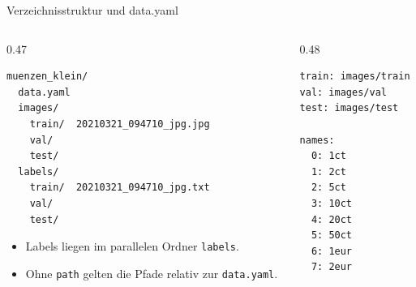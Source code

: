 \begin{frame}[fragile]{Verzeichnisstruktur und data.yaml}
\footnotesize
\begin{columns}
\begin{column}{0.47\textwidth}
{\footnotesize
\begin{verbatim}
muenzen_klein/
  data.yaml
  images/
    train/  20210321_094710_jpg.jpg
    val/
    test/
  labels/
    train/  20210321_094710_jpg.txt
    val/
    test/
\end{verbatim}
}
\begin{itemize}
  \item Labels liegen im parallelen Ordner \texttt{labels}.
  \item Ohne \texttt{path} gelten die Pfade relativ zur \texttt{data.yaml}.
\end{itemize}
\end{column}
\begin{column}{0.48\textwidth}
{\footnotesize
\begin{verbatim}
train: images/train
val: images/val
test: images/test

names:
  0: 1ct
  1: 2ct
  2: 5ct
  3: 10ct
  4: 20ct
  5: 50ct
  6: 1eur
  7: 2eur
\end{verbatim}
}
\end{column}
\end{columns}


\end{frame}
